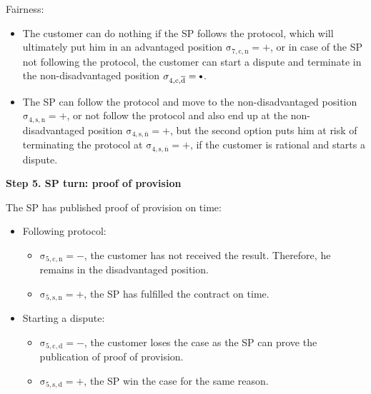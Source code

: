 \documentclass{ieeeaccess}
\newcommand\sbullet[1][.75]{\mathbin{\ThisStyle{\vcenter{\hbox{%
  \scalebox{#1}{$\SavedStyle\bullet$}}}}}%
}
\begin{document}
Fairness:

\begin{itemize}

\item
  The customer can do nothing if the SP follows the protocol, which will ultimately put him in an advantaged position \(\operatorname{\sigma_{7, c, n} = +}\), or in case of the SP not following the protocol, the customer can start a dispute and terminate in the non-disadvantaged position \(\operatorname{\sigma_{4, c, \overline{d}} = \sbullet}\).
\item
  The SP can follow the protocol and move to the non-disadvantaged position \(\operatorname{\sigma_{4, s, n} = +}\), or not follow the protocol and also end up at the non-disadvantaged position \(\operatorname{\sigma_{4, s, \overline{n}} = +}\), but the second option puts him at risk of terminating the protocol at \(\operatorname{\sigma_{4, s, \overline{n}} = +}\), if the customer is rational and starts a dispute.
\end{itemize}

\noindent \textbf
{Step 5. SP turn: proof of provision}\label{step-5-publication-of-proof-of-provision}

The SP has published proof of provision on time:

\begin{itemize}
\item
  Following protocol:

  \begin{itemize}
  
  \item
    \(\operatorname{\sigma_{5, c, n} = -}\), the customer has not received the result. Therefore, he remains in the disadvantaged position. 
  \item
    \(\operatorname{\sigma_{5, s, n} = +}\), the SP has fulfilled the contract on time.
  \end{itemize}
\item
  Starting a dispute:

  \begin{itemize}
  
  \item
    \(\operatorname{\sigma_{5, c, d} = -}\), the customer loses the case as the SP can prove the publication of proof of provision. 
  \item
    \(\operatorname{\sigma_{5, s, d} = +}\), the SP win the case for the same reason.
  \end{itemize}
\end{itemize}
\end{document}
